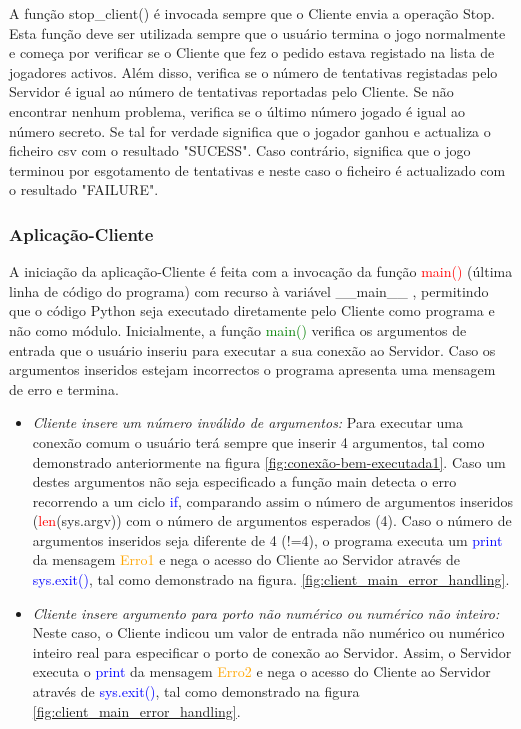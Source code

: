 \clearpage

A função stop\_client() é invocada sempre que o Cliente envia a operação Stop. Esta função deve ser utilizada sempre que o usuário termina o jogo normalmente e começa por verificar se o Cliente que fez o pedido estava registado na lista de jogadores activos. Além disso, verifica se o número de tentativas registadas pelo Servidor é igual ao número de tentativas reportadas pelo Cliente.
Se não encontrar nenhum problema, verifica se o último número jogado é igual ao número secreto. Se tal for verdade significa que o jogador ganhou e actualiza o ficheiro csv com o resultado "SUCESS". Caso contrário, significa que o jogo terminou por esgotamento de tentativas e neste caso o ficheiro é actualizado com o resultado "FAILURE".


\subsubsection{Aplicação-Cliente}
A iniciação da aplicação-Cliente é feita com a invocação da função \textcolor{red}{main()} (última linha de código do programa) com recurso à variável \_\_main\_\_ , permitindo que o  código Python seja executado diretamente pelo Cliente como programa e não como módulo. Inicialmente, a função \textcolor{green}{main()} verifica os argumentos de entrada que o usuário inseriu para executar a sua conexão ao Servidor. Caso os argumentos inseridos estejam incorrectos o programa apresenta uma mensagem de erro e termina. 

\begin{itemize}
	\item\textsl{Cliente insere um número inválido de argumentos:} Para executar uma conexão comum  o usuário terá sempre que inserir 4 argumentos, tal como demonstrado anteriormente na figura \ref{fig:conexão-bem-executada1}. Caso um destes argumentos não seja especificado a função main detecta o erro recorrendo a um ciclo \textcolor{blue}{if}, comparando assim o número de argumentos inseridos (\textcolor{red}{len}(sys.argv)) com o número de argumentos esperados (4). Caso o número de argumentos inseridos seja diferente de 4 (!=4), o programa executa um \textcolor{blue}{print} da mensagem \textcolor{orange}{Erro1} e nega o acesso do Cliente ao Servidor através de \textcolor{blue}{sys.exit()}, tal como demonstrado na figura. \ref{fig:client_main_error_handling}.
	\item\textsl{Cliente insere argumento para porto não numérico ou numérico não inteiro:} Neste caso, o Cliente indicou um valor de entrada não numérico ou numérico inteiro real para especificar o porto de conexão ao Servidor. Assim, o Servidor executa o \textcolor{blue}{print} da mensagem \textcolor{orange}{Erro2} e nega o acesso do Cliente ao Servidor através de \textcolor{blue}{sys.exit()}, tal como demonstrado na figura \ref{fig:client_main_error_handling}.
\end{itemize}

